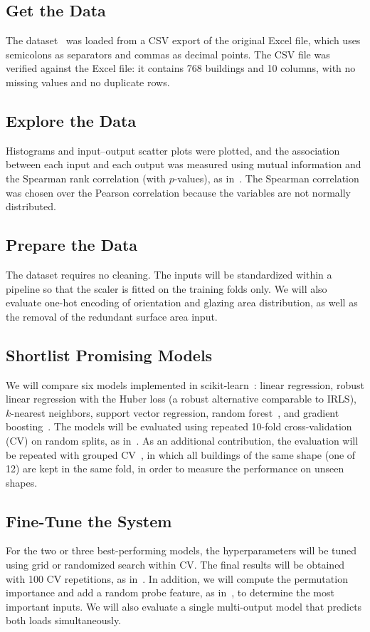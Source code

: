 \documentclass[journal]{IEEEtran}
\begin{document}
\subsection{Get the Data}
The dataset~\cite{uci2012} was loaded from a CSV export of the original Excel file, which uses
semicolons as separators and commas as decimal points. The CSV file was verified against the Excel file:
it contains 768 buildings and 10 columns, with no missing values and no duplicate rows.

\subsection{Explore the Data}
Histograms and input--output scatter plots were plotted, and the association between each input and
each output was measured using mutual information and the Spearman rank correlation (with $p$-values),
as in~\cite{tsanas2012}. The Spearman correlation was chosen over the Pearson correlation because the
variables are not normally distributed.

\subsection{Prepare the Data}
The dataset requires no cleaning. The inputs will be standardized within a pipeline so that the
scaler is fitted on the training folds only. We will also evaluate one-hot encoding of orientation and
glazing area distribution, as well as the removal of the redundant surface area input.

\subsection{Shortlist Promising Models}
We will compare six models implemented in scikit-learn~\cite{pedregosa2011}: linear regression, robust
linear regression with the Huber loss (a robust alternative comparable to IRLS), $k$-nearest neighbors,
support vector regression, random forest~\cite{breiman2001}, and gradient boosting~\cite{friedman2001}.
The models will be evaluated using repeated 10-fold cross-validation (CV) on random splits, as
in~\cite{tsanas2012}. As an additional contribution, the evaluation will be repeated with grouped
CV~\cite{roberts2017}, in which all buildings of the same shape (one of 12) are kept in the same fold,
in order to measure the performance on unseen shapes.

\subsection{Fine-Tune the System}
For the two or three best-performing models, the hyperparameters will be tuned using grid or randomized
search within CV. The final results will be obtained with 100 CV repetitions, as in~\cite{tsanas2012}.
In addition, we will compute the permutation importance and add a random probe feature, as
in~\cite{tsanas2012}, to determine the most important inputs. We will also evaluate a single
multi-output model that predicts both loads simultaneously.
\end{document}
